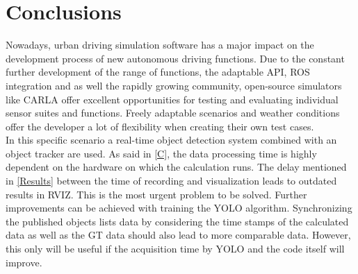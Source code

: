 \section{Conclusions}
	 Nowadays, urban driving simulation software has a major impact on the development process of new autonomous driving functions. Due to the constant further development of the range of functions, the adaptable \ac{API}, \ac{ROS} integration and as well the rapidly growing community, open-source simulators like CARLA offer excellent opportunities for testing and evaluating individual sensor suites and functions. Freely adaptable scenarios and weather conditions offer the developer a lot of flexibility when creating their own test cases.\\
	 
	 
	 
	 In this specific scenario a real-time object detection system combined with an object tracker are used.
	 As said in \cref{C}, the data processing time is highly dependent on the hardware on which the calculation runs. The delay mentioned in \cref{Results} between the time of recording and visualization leads to outdated results in \ac{RVIZ}. This is the most urgent problem to be solved. Further improvements can be achieved with training the \ac{YOLO} algorithm. Synchronizing the published objects lists data by considering the time stamps of the calculated data as well as the \ac{GT} data should also lead to more comparable data. However, this only will be useful if the acquisition time by \ac{YOLO} and the code itself will improve.
	 
	 

	 
	 
	  
	 
	 
	 
	
	 
	 
	
	 
	
	 
	 
	 
	